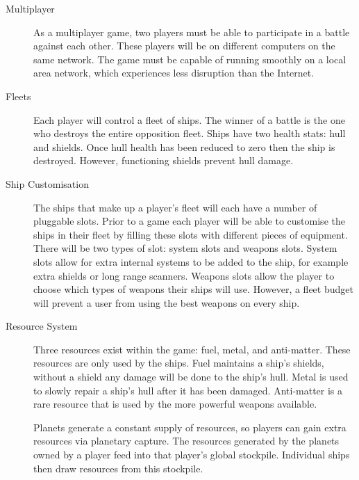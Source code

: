 \begin{description}

	\item[Multiplayer]

	As a multiplayer game, two players must be able to participate in a battle against each other.
	These players will be on different computers on the same network. The game must be capable of running
	smoothly on a local area network, which experiences less disruption than the Internet.

	\item[Fleets]

	Each player will control a fleet of ships. The winner of a battle is the one who destroys
	the entire opposition fleet. Ships have two health stats: hull and shields. Once hull health
	has been reduced to zero then the ship is destroyed. However, functioning shields prevent
	hull damage.

	\item[Ship Customisation]

	The ships that make up a player's fleet will each have a number of pluggable slots.
	Prior to a game each player will be able to customise the ships in their fleet by filling
	these slots with different pieces of equipment.
	There will be two types of slot: system slots and weapons slots. System slots allow for extra
	internal systems to be added to the ship, for example extra shields or long range scanners.
	Weapons slots allow the player to choose which types of weapons their ships will use. However,
	a fleet budget will prevent a user from using the best weapons on every ship.

	\item[Resource System]

	Three resources exist within the game: fuel, metal, and anti-matter. These resources are only
	used by the ships. Fuel maintains a ship's shields, without a shield any damage will be done
	to the ship's hull. Metal is used to slowly repair a ship's hull after it has been damaged.
	Anti-matter is a rare resource that is used by the more powerful weapons available.

	Planets generate a constant supply of resources, so players can gain extra resources via
	planetary capture. The resources generated by the planets owned by a player feed into that
	player's global stockpile. Individual ships then draw resources from this stockpile.



\end{description}
